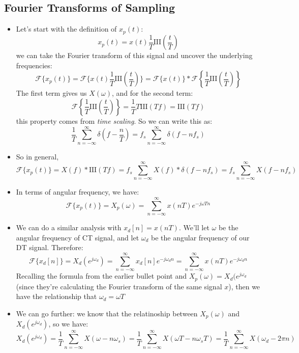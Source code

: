 \subsection{Fourier Transforms of Sampling}
\begin{itemize}
	\item Let's start with the definition of \( x_p(t) \):
		\[
		x_p(t) = x(t) \frac{1}{T}\text{III}\left( \frac{t}{T} \right) 
		\] 
		we can take the Fourier transform of this signal and uncover the underlying frequencies:
		\[
		\mathcal F \{x_p(t)\}  = \mathcal F \{x(t) \frac{1}{T} \text{III}\left( \frac{t}{T} \right) \} 
		= \mathcal F \{x(t)\}  * \mathcal F \left\{ \frac{1}{T}\text{III}\left( \frac{t}{T} \right)  \right\} 
		\] 
		The first term gives us \( X(\omega) \), and for the second term:
		\[
		\mathcal F \left\{ \frac{1}{T}\text{III}\left( \frac{t}{T} \right)  \right\} = \frac{1}{T} T\text{III}(Tf)
		= \text{III}(Tf)
		\] 
		this property comes from \textit{time scaling}. So we can write this as:
		\[
		\frac{1}{T}\sum_{n=-\infty}^{\infty} \delta\left( f - \frac{n}{T} \right)  = f_s
		\sum_{n=-\infty}^{\infty} \delta(f - nf_s)
		\] 

	\item So in general, 
		\[
			\mathcal F \{x_p(t)\} = X(f) * \text{III}(Tf)  = f_s \sum_{n=-\infty}^{\infty} X(f) * \delta(f - nf_s)
			= f_s \sum_{n=-\infty}^{\infty} X(f - nf_s)
		\]
	\item In terms of angular frequency, we have:
		\[
		\mathcal F \{x_p(t)\}  = X_p(\omega) = \sum_{n=-\infty}^{\infty} x(nT) e^{-j \omega T n}
		\] 
	\item We can do a similar analysis with \( x_d[n] = x(nT) \). We'll let \( \omega \) be the angular frequency 
		of CT signal, and let \( \omega_d \) be the angular frequency of our DT signal. Therefore:
		\[
			\mathcal F \{x_d[n]\}  = X_d(e^{j \omega_d}) = \sum_{n=-\infty}^{\infty} x_d[n] e^{-j \omega_d n}
			= \sum_{n=-\infty}^{\infty} x(nT) e^{-j \omega_d n}
		\] 
		Recalling the formula from the earlier bullet point and \( X_p(\omega) = X_d(e^{j \omega_d} \) (since 
		they're calculating the Fourier transform of the same signal \( x \)), then we have the relationship
		that \( \omega_d = \omega T \)
	\item We can go further: we know that the relatinoship between \( X_p(\omega)  \) and 
		\( X_d(e^{j \omega_d}) \), so we have:
		\[
		X_d(e^{j \omega_d}) = \frac{1}{T}\sum_{n=-\infty}^{\infty} X(\omega - n \omega_s) 
		= \frac{1}{T}\sum_{n=-\infty}^{\infty} X(\omega T - n \omega_s T) = \frac{1}{T}\sum_{n=-\infty}^{\infty} 
		X(\omega_d - 2 \pi n)
		\] 
\end{itemize}
